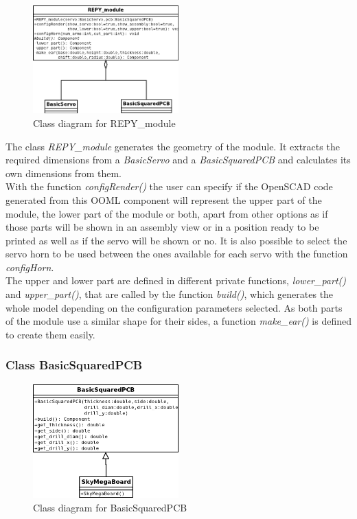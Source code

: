 \begin{figure}[h]
		\centering
        \includegraphics[width=0.5\textwidth]{images/REPY2_class_diagram_REPY_module.png}
        \caption{Class diagram for REPY\_module}
        \label{fig:hardware_class_diagram_REPY_module}
\end{figure} 

The class \emph{REPY\_module} generates the geometry of the module. It extracts the required dimensions from a \emph{BasicServo} and a \emph{BasicSquaredPCB} and calculates its own dimensions from them.\\

With the function \emph{configRender()} the user can specify if the OpenSCAD code generated from this OOML component will represent the upper part of the module, the lower part of the module or both, apart from other options as if those parts will be shown in an assembly view or in a position ready to be printed as well as if the servo will be shown or no. It is also possible to select the servo horn to be used between the ones available for each servo with the function \emph{configHorn}.\\

The upper and lower part are defined in different private functions, \emph{lower\_part()} and \emph{upper\_part()}, that are called by the function \emph{build()}, which generates the whole model depending on the configuration parameters selected. As both parts of the module use a similar shape for their sides, a function \emph{make\_ear()} is defined to create them easily.\\


\subsubsection{Class BasicSquaredPCB}
\begin{figure}[h]
		\centering
        \includegraphics[width=0.5\textwidth]{images/REPY2_class_diagram_BasicSquaredPCB.png}
        \caption{Class diagram for BasicSquaredPCB}
        \label{fig:hardware_class_diagram_BasicSquaredPCB}
\end{figure} 

